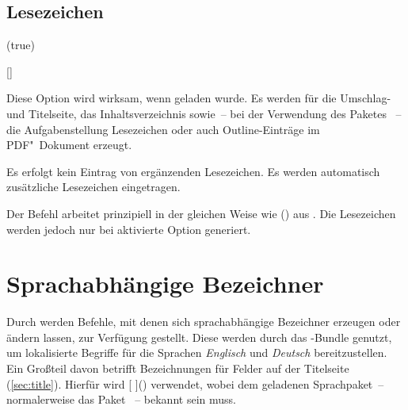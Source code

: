 \begin{DeclareEntity*}{}
\begin{DeclareEntity*}{}
\begin{DeclareEntity*}{}
\subsection{%
  Lesezeichen%
}

\begin{Declaration}
  {}
  (true)
\begin{Declaration}
  {[]}
\printdeclarationlist

Diese Option wird wirksam, wenn  geladen wurde. Es werden für 
die Umschlag- und Titelseite, das Inhaltsverzeichnis sowie~-- bei der 
Verwendung des Paketes ~-- die Aufgabenstellung 
Lesezeichen oder auch Outline-Einträge im PDF"~Dokument erzeugt.
\begin{DeclareValues}
  Es erfolgt kein Eintrag von ergänzenden Lesezeichen.
  Es werden automatisch zusätzliche Lesezeichen eingetragen.
\end{DeclareValues}

Der Befehl  arbeitet prinzipiell in der gleichen Weise wie 
() aus . Die Lesezeichen 
werden jedoch nur bei aktivierte Option  generiert.
\end{Declaration}
\end{Declaration}



\section{%
  Sprachabhängige Bezeichner%
  \label{sec:localization}%
}

Durch \KOMAScript werden Befehle, mit denen sich sprachabhängige Bezeichner 
erzeugen oder ändern lassen, zur Verfügung gestellt. Diese werden durch das
\TUDScript-Bundle genutzt, um lokalisierte Begriffe für die Sprachen 
\emph{Englisch} und \emph{Deutsch} bereitzustellen. Ein Großteil davon betrifft 
Bezeichnungen für Felder auf der Titelseite (\autoref{sec:title}). Hierfür wird
[%
]()
verwendet, wobei  dem geladenen Sprachpaket~-- normalerweise das 
Paket ~-- bekannt sein muss.


\end{DeclareEntity*}
\end{DeclareEntity*}
\end{DeclareEntity*}

